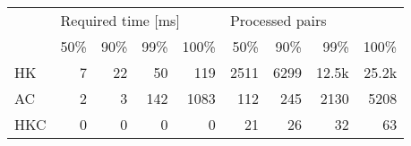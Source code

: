 \begin{tabular}{l|rrrr|rrrr}
\multirow{2}{*}{} & \multicolumn{4}{l|}{Required time {[}ms{]}} & \multicolumn{4}{l}{Processed pairs} \\ \cline{2-9}
                  & 50\% & 90\% & 99\% & 100\%                 & 50\%   & 90\%   & 99\%    & 100\%   \\ \hline
HK                & 7    & 22   & 50   & 119                   & 2511   & 6299   & 12.5k   & 25.2k   \\
AC                & 2    & 3    & 142  & 1083                  & 112    & 245    & 2130    & 5208    \\
HKC               & 0    & 0    & 0    & 0                     & 21     & 26     & 32      & 63      \\
\end{tabular}
